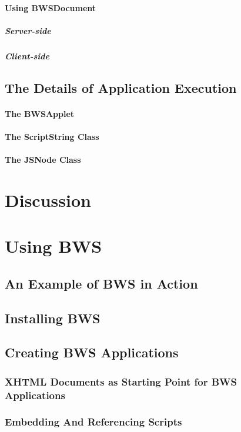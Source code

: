   \paragraph{Using BWSDocument}
    \subparagraph{Server-side}
    \subparagraph{Client-side}
  \subsection{The Details of Application Execution}
   \paragraph{The BWSApplet}
   \paragraph{The ScriptString Class}
   \paragraph{The JSNode Class}
\section{Discussion}

\section{Using BWS}

 \subsection{An Example of BWS in Action}
 \subsection{Installing BWS}
 \subsection{Creating BWS Applications}
 
  \subsubsection{XHTML Documents as Starting Point for BWS Applications}

  

  \subsubsection{Embedding And Referencing Scripts}

